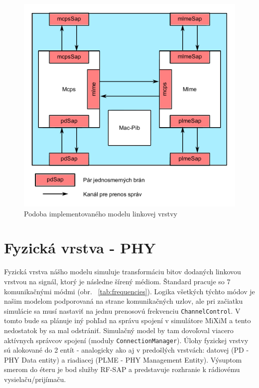 \begin{figure}[htbp]
\begin{center}
\includegraphics[width=120mm]{figures/architecture_mac}
\caption{Podoba implementovaného modelu linkovej vrstvy}
\label{fig:architecture_mac}
\end{center}
\end{figure}

\section{Fyzická vrstva - PHY}
\indent\indent Fyzická vrstva nášho modelu simuluje transformáciu bitov dodaných linkovou vrstvou na signál, ktorý je následne šírený médiom. Štandard pracuje so 7 komunikačnými módmi (obr. ~\ref{tab:frequencies}). Logika všetkých týchto módov je našim modelom podporovaná na strane komunikačných uzlov, ale pri začiatku simulácie sa musí nastaviť na jednu prenosovú frekvenciu \texttt{ChannelControl}. V tomto bude sa plánuje iný pohľad na správu spojení v simulátore MiXiM a tento nedostatok by sa mal odstrániť. Simulačný model by tam dovoľoval viacero aktívnych správcov spojení (moduly \texttt{ConnectionManager}). Úlohy fyzickej vrstvy sú alokované do 2 entít - analogicky ako aj v predošlých vrstvách: datovej (PD - PHY Data entity) a riadiacej (PLME - PHY Management Entity). Výsuptom smerom do éteru je bod služby RF-SAP a predstavuje rozhranie k rádiovému vysielaču/prijímaču.\\


